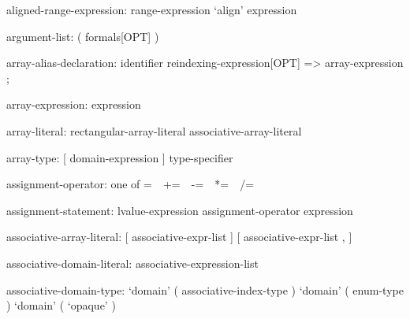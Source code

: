 \begin{syntax}
\end{syntax}

\begin{syntax}
aligned-range-expression:
  range-expression `align' expression
\end{syntax}

\begin{syntax}
argument-list:
  ( formals[OPT] )
\end{syntax}

\begin{syntax}
array-alias-declaration:
  identifier reindexing-expression[OPT] => array-expression ;
\end{syntax}

\begin{syntax}
array-expression:
  expression
\end{syntax}

\begin{syntax}
array-literal:
  rectangular-array-literal
  associative-array-literal
\end{syntax}

\begin{syntax}
array-type:
  [ domain-expression ] type-specifier
\end{syntax}

\begin{syntax}
assignment-operator: one of
   = $ $ $ $ += $ $ $ $ -= $ $ $ $ *= $ $ $ $ /= $ $ $ $ %
\end{syntax}

\begin{syntax}
assignment-statement:
  lvalue-expression assignment-operator expression
\end{syntax}

\begin{syntax}
associative-array-literal:
  [ associative-expr-list ]
  [ associative-expr-list , ]
\end{syntax}

\begin{syntax}
associative-domain-literal:
   { associative-expression-list }
\end{syntax}

\begin{syntax}
associative-domain-type:
  `domain' ( associative-index-type )
  `domain' ( enum-type )
  `domain' ( `opaque' )
\end{syntax}

